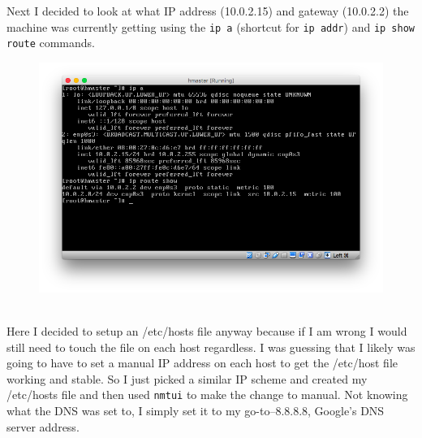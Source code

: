 \documentclass[10pt]{article}
\begin{document}
\indent Next I decided to look at what IP address (10.0.2.15) and gateway (10.0.2.2) the machine was currently getting using the \verb|ip a| (shortcut for \verb|ip addr|) and \verb|ip show route| commands.
\begin{figure}[!h]
\includegraphics[scale=0.37]{ip_a.png}
\centering
\end{figure}\\
Here I decided to setup an /etc/hosts file anyway because if I am wrong I would still need to touch the file on each host regardless. I was guessing that I likely was going to have to set a manual IP address on each host to get the /etc/host file working and stable. So I just picked a similar IP scheme and created my /etc/hosts file and then used \verb|nmtui| to make the change to manual. Not knowing what the DNS was set to, I simply set it to my go-to--8.8.8.8, Google's DNS server address.
\par
{}%
\hfill
{}%
\end{document}
